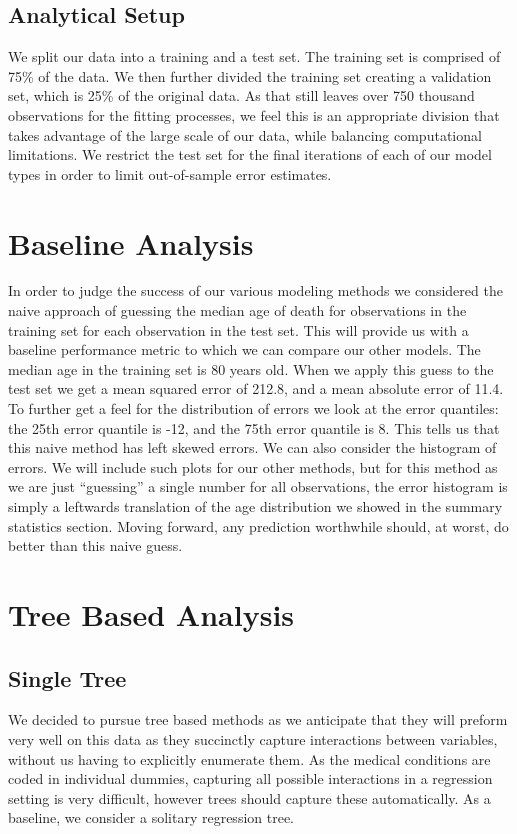 \documentclass[letterpaper, 10 pt, conference]{ieeeconf}  %
\begin{document}
\subsection{Analytical Setup}
We split our data into a training and a test set. The training set is comprised of 75\% of the data. We then further divided the training set creating a validation set, which is 25\% of the original data. As that still leaves over 750 thousand observations for the fitting processes, we feel this is an appropriate division that takes advantage of the large scale of our data, while balancing computational limitations. We restrict the test set for the final iterations of each of our model types in order to limit out-of-sample error estimates. 

\section{Baseline Analysis}
In order to judge the success of our various modeling methods we considered the naive approach of guessing the median age of death for observations in the training set for each observation in the test set. This will provide us with a baseline performance metric to which we can compare our other models. The median age in the training set is 80 years old. When we apply this guess to the test set we get a mean squared error of 212.8, and a mean absolute error of 11.4. To further get a feel for the distribution of errors we look at the error quantiles: the 25th error quantile is -12, and the 75th error quantile is 8. This tells us that this naive method has left skewed errors. We can also consider the histogram of errors. We will include such plots for our other methods, but for this method as we are just ``guessing'' a single number for all observations, the error histogram is simply a leftwards translation of the age distribution we showed in the summary statistics section. Moving forward, any prediction worthwhile should, at worst, do better than this naive guess. 


\section{Tree Based Analysis}


\subsection{Single Tree}
We decided to pursue tree based methods as we anticipate that they will preform very well on this data as they succinctly capture interactions between variables, without us having to explicitly enumerate them. As the medical conditions are coded in individual dummies, capturing all possible interactions in a regression setting is very difficult, however trees should capture these automatically. As a baseline, we consider a solitary regression tree. 
\end{document}
